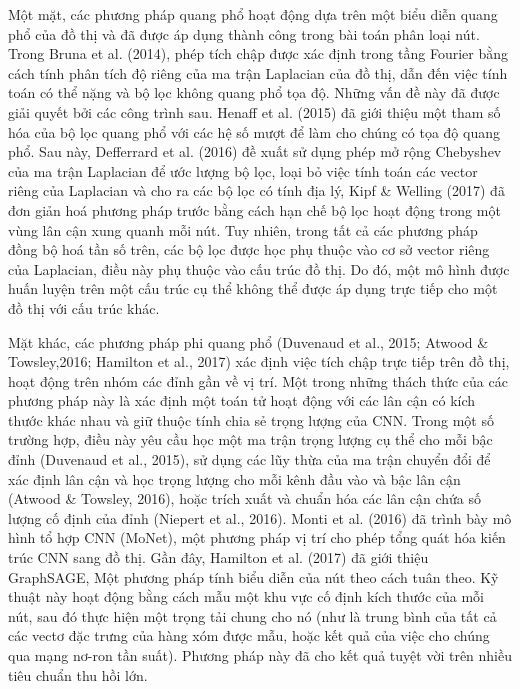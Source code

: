 Một mặt, các phương pháp quang phổ hoạt động dựa trên một biểu diễn quang phổ của đồ thị và đã được áp dụng thành công trong bài toán phân loại nút. Trong Bruna et al. (2014), phép tích chập được xác định trong tầng Fourier bằng cách tính phân tích độ riêng của ma trận Laplacian của đồ thị, dẫn đến việc tính toán có thể nặng và bộ lọc không quang phổ tọa độ. Những vấn đề này đã được giải quyết bởi các công trình sau. Henaff et al. (2015) đã giới thiệu một tham số hóa của bộ lọc quang phổ với các hệ số mượt để làm cho chúng có tọa độ quang phổ. Sau này, Defferrard et al. (2016) đề xuất sử dụng phép mở rộng Chebyshev của ma trận Laplacian để ước lượng bộ lọc, loại bỏ việc tính toán các vector riêng của Laplacian và cho ra các bộ lọc có tính địa lý, Kipf \& Welling (2017) đã đơn giản hoá phương pháp trước bằng cách hạn chế bộ lọc hoạt động trong một vùng lân cận xung quanh mỗi nút. Tuy nhiên, trong tất cả các phương pháp đồng bộ hoá tần số trên, các bộ lọc được học phụ thuộc vào cơ sở vector riêng của Laplacian, điều này phụ thuộc vào cấu trúc đồ thị. Do đó, một mô hình được huấn luyện trên một cấu trúc cụ thể không thể được áp dụng trực tiếp cho một đồ thị với cấu trúc khác.

Mặt khác, các phương pháp phi quang phổ (Duvenaud et al., 2015; Atwood \& Towsley,2016; Hamilton et al., 2017) xác định việc tích chập trực tiếp trên đồ thị, hoạt động trên nhóm các đỉnh gần về vị trí. Một trong những thách thức của các phương pháp này là xác định một toán tử hoạt động với các lân cận có kích thước khác nhau và giữ thuộc tính chia sẻ trọng lượng của CNN. Trong một số trường hợp, điều này yêu cầu học một ma trận trọng lượng cụ thể cho mỗi bậc đỉnh (Duvenaud et al., 2015), sử dụng các lũy thừa của ma trận chuyển đổi để xác định lân cận và học trọng lượng cho mỗi kênh đầu vào và bậc lân cận (Atwood \& Towsley, 2016), hoặc trích xuất và chuẩn hóa các lân cận chứa số lượng cố định của đỉnh (Niepert et al., 2016). Monti et al. (2016) đã trình bày mô hình tổ hợp CNN (MoNet), một phương pháp vị trí cho phép tổng quát hóa kiến trúc CNN sang đồ thị. Gần đây, Hamilton et al. (2017) đã giới thiệu GraphSAGE, Một phương pháp tính biểu diễn của nút theo cách tuân theo. Kỹ thuật này hoạt động bằng cách mẫu một khu vực cố định kích thước của mỗi nút, sau đó thực hiện một trọng tải chung cho nó (như là trung bình của tất cả các vectơ đặc trưng của hàng xóm được mẫu, hoặc kết quả của việc cho chúng qua mạng nơ-ron tần suất). Phương pháp này đã cho kết quả tuyệt vời trên nhiều tiêu chuẩn thu hồi lớn.



